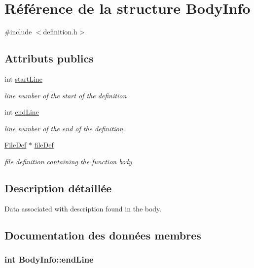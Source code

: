 \hypertarget{struct_body_info}{}\section{Référence de la structure Body\+Info}
\label{struct_body_info}


{\ttfamily \#include $<$definition.\+h$>$}

\subsection*{Attributs publics}
\begin{DoxyCompactItemize}
\item 
int \hyperlink{struct_body_info_a13ecf2183dee65bdf06cda72cd0363a0}{start\+Line}
\begin{DoxyCompactList}\small\item\em line number of the start of the definition \end{DoxyCompactList}\item 
int \hyperlink{struct_body_info_adf40ab79b5fe12c0e46fcd272a62cf44}{end\+Line}
\begin{DoxyCompactList}\small\item\em line number of the end of the definition \end{DoxyCompactList}\item 
\hyperlink{class_file_def}{File\+Def} $\ast$ \hyperlink{struct_body_info_a0a09e75f0c6dbd45673103dccc125172}{file\+Def}
\begin{DoxyCompactList}\small\item\em file definition containing the function body \end{DoxyCompactList}\end{DoxyCompactItemize}


\subsection{Description détaillée}
Data associated with description found in the body. 

\subsection{Documentation des données membres}
\hypertarget{struct_body_info_adf40ab79b5fe12c0e46fcd272a62cf44}{}
\subsubsection[{end\+Line}]{\setlength{\rightskip}{0pt plus 5cm}int Body\+Info\+::end\+Line}\label{struct_body_info_adf40ab79b5fe12c0e46fcd272a62cf44}


